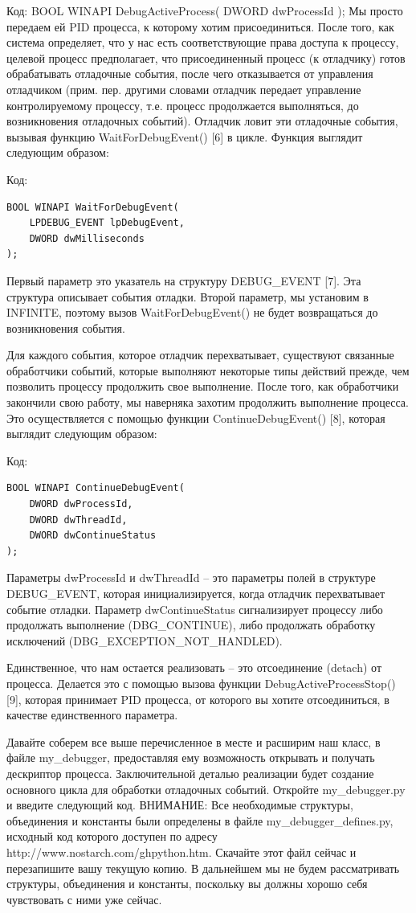 \documentclass[12pt, a4paper, oneside]{book}
\begin{document}
Код:
BOOL WINAPI DebugActiveProcess(
    DWORD dwProcessId
);
Мы просто передаем ей PID процесса, к которому хотим присоединиться. После того, как система определяет, что у нас есть соответствующие права доступа к процессу, целевой процесс предполагает, что присоединенный процесс (к отладчику) готов обрабатывать отладочные события, после чего отказывается от управления отладчиком (прим. пер. другими словами отладчик передает управление контролируемому процессу, т.е. процесс продолжается выполняться, до возникновения отладочных событий). Отладчик ловит эти отладочные события, вызывая функцию WaitForDebugEvent() [6] в цикле. Функция выглядит следующим образом:

Код:
\begin{verbatim}
BOOL WINAPI WaitForDebugEvent(
    LPDEBUG_EVENT lpDebugEvent,
    DWORD dwMilliseconds
);
\end{verbatim}

Первый параметр это указатель на структуру DEBUG\_EVENT [7]. Эта структура описывает события отладки. Второй параметр, мы установим в INFINITE, поэтому вызов WaitForDebugEvent() не будет возвращаться до возникновения события.

Для каждого события, которое отладчик перехватывает, существуют связанные обработчики событий, которые выполняют некоторые типы действий прежде, чем позволить процессу продолжить свое выполнение. После того, как обработчики закончили свою работу, мы наверняка захотим продолжить выполнение процесса. Это осуществляется с помощью функции ContinueDebugEvent() [8], которая выглядит следующим образом: 

Код:
\begin{verbatim}
BOOL WINAPI ContinueDebugEvent(
    DWORD dwProcessId,
    DWORD dwThreadId,
    DWORD dwContinueStatus
);
\end{verbatim}

Параметры dwProcessId и dwThreadId – это параметры полей в структуре DEBUG\_EVENT, которая инициализируется, когда отладчик перехватывает событие отладки. Параметр dwContinueStatus сигнализирует процессу либо продолжать выполнение (DBG\_CONTINUE), либо продолжать обработку исключений (DBG\_EXCEPTION\_NOT\_HANDLED).

Единственное, что нам остается реализовать – это отсоединение (detach) от процесса. Делается это с помощью вызова функции DebugActiveProcessStop() [9], которая принимает PID процесса, от которого вы хотите отсоединиться, в качестве единственного параметра.

Давайте соберем все выше перечисленное в месте и расширим наш класс, в файле my\_debugger, предоставляя ему возможность открывать и получать дескриптор процесса. Заключительной деталью реализации будет создание основного цикла для обработки отладочных событий. Откройте my\_debugger.py и введите следующий код.
ВНИМАНИЕ: Все необходимые структуры, объединения и константы были определены в файле my\_debugger\_defines.py, исходный код которого доступен по адресу http://www.nostarch.com/ghpython.htm. Скачайте этот файл сейчас и перезапишите вашу текущую копию. В дальнейшем мы не будем рассматривать структуры, объединения и константы, поскольку вы должны хорошо себя чувствовать с ними уже сейчас.
\end{document}
